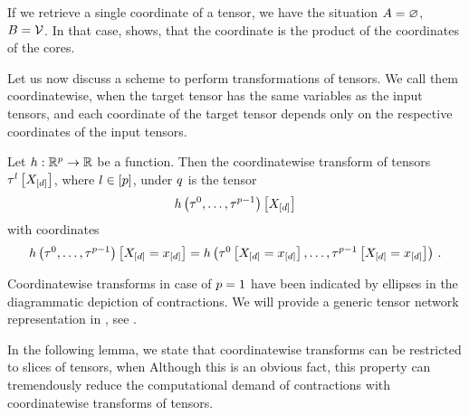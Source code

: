 If we retrieve a single coordinate of a tensor, we have the situation $A=\varnothing$, $B=\mathcal{V}$.
In that case,  shows, that the coordinate is the product of the coordinates of the cores. %

\label{sec:coordinatewiseTransforms}

Let us now discuss a scheme to perform transformations of tensors.
We call them coordinatewise, when the target tensor has the same variables as the input tensors, and each coordinate of the target tensor depends only on the respective coordinates of the input tensors. %

\begin{definition}
    \label{def:coordinatewiseTransform}
    Let $h: \mathbb{R}^{p} \rightarrow \mathbb{R}$ be a function.
    Then the coordinatewise transform of tensors $\tau^{l}\left[X_{[d]}\right]$, where $l\in[p]$, under $q$ is the tensor
    \begin{align*}
        {h}\left(\tau^{0},\ldots,\tau^{p-1}\right)\left[X_{[d]}\right]
    \end{align*}
    with coordinates
    \begin{align*}
        {h}\left(\tau^{0},\ldots,\tau^{p-1}\right)\left[X_{[d]}=x_{[d]}\right]
        = h\left(\tau^{0}\left[X_{[d]}=x_{[d]}\right],\ldots,\tau^{p-1}\left[X_{[d]}=x_{[d]}\right]\right) \, .
    \end{align*}
\end{definition}

Coordinatewise transforms in case of $p=1$ have been indicated by ellipses in the diagrammatic depiction of contractions.
We will provide a generic tensor network representation in , see .


In the following lemma, we state that coordinatewise transforms can be restricted to slices of tensors, when
Although this is an obvious fact, this property can tremendously reduce the computational demand of contractions with coordinatewise transforms of tensors.

